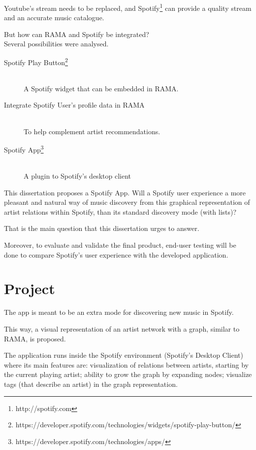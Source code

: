 Youtube's stream needs to be replaced, and Spotify\footnote{http://spotify.com} can provide a quality stream and an accurate music catalogue.

But how can RAMA and Spotify be integrated? \\

Several possibilities were analysed.

\begin{description}
  \item[Spotify Play Button\footnote{https://developer.spotify.com/technologies/widgets/spotify-play-button/}] \hfill \\
    A Spotify widget that can be embedded in RAMA. 
  \item[Integrate Spotify User's profile data in RAMA] \hfill \\
    To help complement artist recommendations.
  \item[Spotify App\footnote{https://developer.spotify.com/technologies/apps/}] \hfill \\
    A plugin to Spotify's desktop client
\end{description}


This dissertation proposes a Spotify App.
Will a Spotify user experience a more pleasant and natural way of music discovery from this graphical representation of artist relations within Spotify, than its standard discovery mode (with lists)?

That is the main question that this dissertation urges to answer.

Moreover, to evaluate and validate the final product, end-user testing will be done to compare Spotify's user experience with the developed application. 


\section{Project} \label{sec:proj}

The app is meant to be an extra mode for discovering new music in Spotify.

This way, a visual representation of an artist network with a graph, similar to RAMA, is proposed.

The application runs inside the Spotify environment (Spotify's Desktop Client) where its main features are: visualization of relations between artists, starting by the current playing artist; ability to grow the graph by expanding nodes; visualize tags (that describe an artist) in the graph representation.

